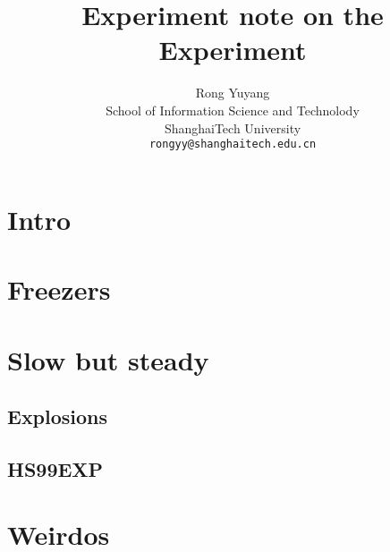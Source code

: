 \documentclass[10pt]{article}
\begin{document}
\title{
	Experiment note on the Experiment
}
\author{Rong Yuyang \\
School of Information Science and Technolody\\
ShanghaiTech University\\
{\tt\small rongyy@shanghaitech.edu.cn}
}
\maketitle

\section{Intro}

\section{Freezers}

\section{Slow but steady}
	\subsection{Explosions}

	\subsection{HS99EXP}

\section{Weirdos}
\end{document}
